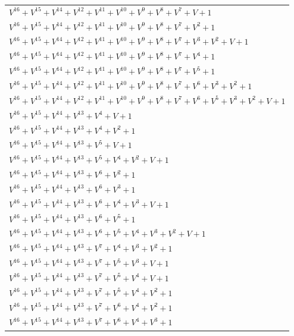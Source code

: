\documentclass[12pt]{article}
\begin{document}
\begin{adjustwidth}{-4cm}{}
\begin{center}
\begin{longtable}{|l|}
$V^{16}  +V^{15}  +V^{14}  +V^{12}  +V^{11}  +V^{10}  +V^{9}  +V^{8}  +V^{7}  + V + 1$ \\
$V^{16}  +V^{15}  +V^{14}  +V^{12}  +V^{11}  +V^{10}  +V^{9}  +V^{8}  +V^{7}  +V^{2}  + 1$ \\
$V^{16}  +V^{15}  +V^{14}  +V^{12}  +V^{11}  +V^{10}  +V^{9}  +V^{8}  +V^{7}  +V^{3}  +V^{2}  + V + 1$ \\
$V^{16}  +V^{15}  +V^{14}  +V^{12}  +V^{11}  +V^{10}  +V^{9}  +V^{8}  +V^{7}  +V^{4}  + 1$ \\
$V^{16}  +V^{15}  +V^{14}  +V^{12}  +V^{11}  +V^{10}  +V^{9}  +V^{8}  +V^{7}  +V^{5}  + 1$ \\
$V^{16}  +V^{15}  +V^{14}  +V^{12}  +V^{11}  +V^{10}  +V^{9}  +V^{8}  +V^{7}  +V^{6}  +V^{3}  +V^{2}  + 1$ \\
$V^{16}  +V^{15}  +V^{14}  +V^{12}  +V^{11}  +V^{10}  +V^{9}  +V^{8}  +V^{7}  +V^{6}  +V^{5}  +V^{3}  +V^{2}  + V + 1$ \\
$V^{16}  +V^{15}  +V^{14}  +V^{13}  +V^{4}  + V + 1$ \\
$V^{16}  +V^{15}  +V^{14}  +V^{13}  +V^{4}  +V^{2}  + 1$ \\
$V^{16}  +V^{15}  +V^{14}  +V^{13}  +V^{5}  + V + 1$ \\
$V^{16}  +V^{15}  +V^{14}  +V^{13}  +V^{5}  +V^{4}  +V^{2}  + V + 1$ \\
$V^{16}  +V^{15}  +V^{14}  +V^{13}  +V^{6}  +V^{2}  + 1$ \\
$V^{16}  +V^{15}  +V^{14}  +V^{13}  +V^{6}  +V^{3}  + 1$ \\
$V^{16}  +V^{15}  +V^{14}  +V^{13}  +V^{6}  +V^{4}  +V^{3}  + V + 1$ \\
$V^{16}  +V^{15}  +V^{14}  +V^{13}  +V^{6}  +V^{5}  + 1$ \\
$V^{16}  +V^{15}  +V^{14}  +V^{13}  +V^{6}  +V^{5}  +V^{4}  +V^{3}  +V^{2}  + V + 1$ \\
$V^{16}  +V^{15}  +V^{14}  +V^{13}  +V^{7}  +V^{4}  +V^{3}  +V^{2}  + 1$ \\
$V^{16}  +V^{15}  +V^{14}  +V^{13}  +V^{7}  +V^{5}  +V^{3}  + V + 1$ \\
$V^{16}  +V^{15}  +V^{14}  +V^{13}  +V^{7}  +V^{5}  +V^{4}  + V + 1$ \\
$V^{16}  +V^{15}  +V^{14}  +V^{13}  +V^{7}  +V^{5}  +V^{4}  +V^{2}  + 1$ \\
$V^{16}  +V^{15}  +V^{14}  +V^{13}  +V^{7}  +V^{6}  +V^{4}  +V^{2}  + 1$ \\
$V^{16}  +V^{15}  +V^{14}  +V^{13}  +V^{7}  +V^{6}  +V^{4}  +V^{3}  + 1$ \\

\end{longtable}
\end{center}
\end{adjustwidth}
\end{document}
